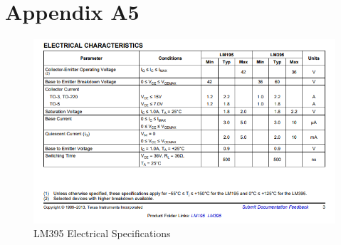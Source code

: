 \documentclass[class=report,11pt,crop=false]{standalone}
\begin{document}
	\chapter{Appendix A5}
	\begin{figure}[h!]
		\centering
		\includegraphics[width=0.4\linewidth]{Figures/LM395 SPECS}
		\caption{LM395 Electrical Specifications}
		\label{fig:P5}
	\end{figure}
	\ifstandalone
	
	\printnoidxglossary[type=\acronymtype,nonumberlist]
	\fi
\end{document}
